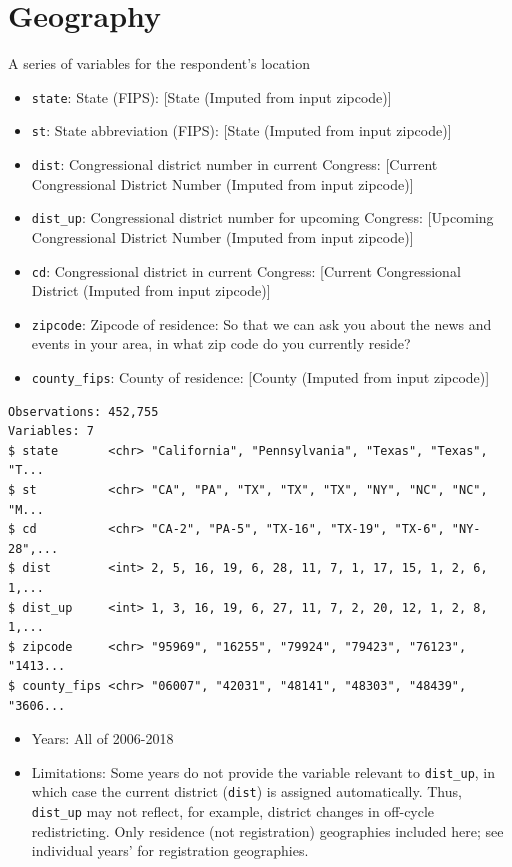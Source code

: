 \documentclass[10pt,article,oneside]{memoir}
\theoremstyle{definition}
\begin{document}
\hypertarget{geography}{%
\section{Geography}\label{geography}}

A series of variables for the respondent's location

\begin{itemize}
\tightlist
\item
  \texttt{state}: State (FIPS): {[}State (Imputed from input zipcode){]}
\item
  \texttt{st}: State abbreviation (FIPS): {[}State (Imputed from input
  zipcode){]}
\item
  \texttt{dist}: Congressional district number in current Congress:
  {[}Current Congressional District Number (Imputed from input
  zipcode){]}
\item
  \texttt{dist\_up}: Congressional district number for upcoming
  Congress: {[}Upcoming Congressional District Number (Imputed from
  input zipcode){]}
\item
  \texttt{cd}: Congressional district in current Congress: {[}Current
  Congressional District (Imputed from input zipcode){]}
\item
  \texttt{zipcode}: Zipcode of residence: So that we can ask you about
  the news and events in your area, in what zip code do you currently
  reside?
\item
  \texttt{county\_fips}: County of residence: {[}County (Imputed from
  input zipcode){]}
\end{itemize}

\begin{verbatim}
Observations: 452,755
Variables: 7
$ state       <chr> "California", "Pennsylvania", "Texas", "Texas", "T...
$ st          <chr> "CA", "PA", "TX", "TX", "TX", "NY", "NC", "NC", "M...
$ cd          <chr> "CA-2", "PA-5", "TX-16", "TX-19", "TX-6", "NY-28",...
$ dist        <int> 2, 5, 16, 19, 6, 28, 11, 7, 1, 17, 15, 1, 2, 6, 1,...
$ dist_up     <int> 1, 3, 16, 19, 6, 27, 11, 7, 2, 20, 12, 1, 2, 8, 1,...
$ zipcode     <chr> "95969", "16255", "79924", "79423", "76123", "1413...
$ county_fips <chr> "06007", "42031", "48141", "48303", "48439", "3606...
\end{verbatim}

\begin{itemize}
\tightlist
\item
  Years: All of 2006-2018
\item
  Limitations: Some years do not provide the variable relevant to
  \texttt{dist\_up}, in which case the current district (\texttt{dist})
  is assigned automatically. Thus, \texttt{dist\_up} may not reflect,
  for example, district changes in off-cycle redistricting. Only
  residence (not registration) geographies included here; see individual
  years' for registration geographies.
\end{itemize}
\end{document}

